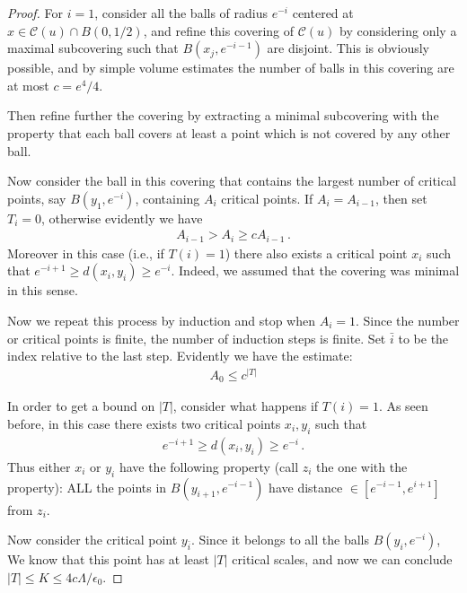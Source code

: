 \documentclass[11pt]{article}
\begin{document}
\begin{appendix}
\begin{proof}
For $i=1$, consider all the balls of radius $e^{-i}$ centered at $x\in {\mathcal{C}(u)}\cap B(0,1/2)$, and refine this covering of ${\mathcal{C}(u)}$ by considering only a maximal subcovering such that $B(x_j, e^{-i-1})$ are disjoint. This is obviously possible, and by simple volume estimates the number of balls in this covering are at most $c=e^4/4$.

Then refine further the covering by extracting a minimal subcovering with the property that each ball covers at least a point which is not covered by any other ball.

Now consider the ball in this covering that contains the largest number of critical points, say $B(y_1,e^{-i})$, containing $A_i$ critical points. If $A_i = A_{i-1}$, then set $T_i=0$, otherwise evidently we have
\begin{gather}
A_{i-1}> A_i \geq c A_{i-1}\, .
\end{gather}
Moreover in this case (i.e., if $T(i)=1$) there also exists a critical point $x_i$ such that $e^{-i+1}\geq d(x_i,y_i)\geq e^{-i}$. Indeed, we assumed that the covering was minimal in this sense.

Now we repeat this process by induction and stop when $A_i =1$. Since the number or critical points is finite, the number of induction steps is finite. Set $\bar i$ to be the index relative to the last step. Evidently we have the estimate:
\begin{gather}
 A_0 \leq c^{{\left|T\right|}} 
\end{gather}

In order to get a bound on ${\left|T\right|}$, consider what happens if $T(i)=1$. As seen before, in this case there exists two critical points $x_i,y_i$ such that
\begin{gather}
 e^{-i+1}\geq d(x_i,y_i)\geq e^{-i}\, .
\end{gather}
Thus either $x_i$ or $y_i$ have the following property (call $z_i$ the one with the property): ALL the points in $B(y_{i+1},e^{-i-1})$ have distance $\in[e^{-i-1},e^{i+1}]$ from $z_i$.

Now consider the critical point $y_{\bar i}$. Since it belongs to all the balls $B(y_i,e^{-i})$, We know that this point has at least ${\left|T\right|}$ critical scales, and now we can conclude ${\left|T\right|} \leq K\leq 4c\Lambda/\epsilon_0$.
\end{proof}


\end{appendix}
\end{document}

